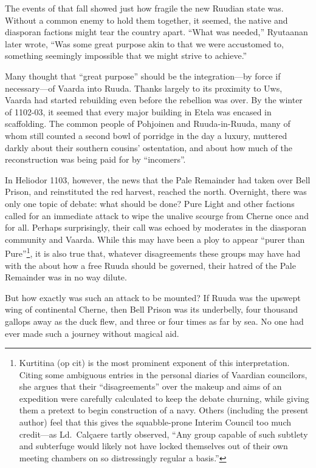 \documentclass[12pt]{report}
\begin{document}
The events of that fall showed just how fragile the new Ruudian state
was.  Without a common enemy to hold them together, it seemed, the
native and diasporan factions might tear the country apart.  ``What was
needed,'' Ryutaanan later wrote, ``Was some great purpose akin to that
we were accustomed to, something seemingly impossible that we might
strive to achieve.''

Many thought that ``great purpose'' should be the integration---by force
if necessary---of Vaarda into Ruuda.  Thanks largely to its proximity
to Uws, Vaarda had started rebuilding even before the rebellion was
over.  By the winter of 1102-03, it seemed that every major building
in Etela was encased in scaffolding.  The common people of Pohjoinen
and Ruuda-in-Ruuda, many of whom still counted a second bowl of
porridge in the day a luxury, muttered darkly about their southern
cousins' ostentation, and about how much of the reconstruction was
being paid for by ``incomers''.

In Heliodor 1103, however, the news that the Pale Remainder had taken
over Bell Prison, and reinstituted the red harvest, reached the north.
Overnight, there was only one topic of debate: what should be done?
Pure Light and other {\aemott} factions called for an immediate attack
to wipe the unalive scourge from Cherne once and for all.  Perhaps
surprisingly, their call was echoed by moderates in the diasporan
community and Vaarda.  While this may have been a ploy to appear
``purer than Pure''\footnote{Kurtitina (op cit) is the most prominent
exponent of this interpretation.  Citing some ambiguous entries in the
personal diaries of Vaardian councilors, she argues that their
``disagreements'' over the makeup and aims of an expedition were
carefully calculated to keep the debate churning, while giving them a
pretext to begin construction of a navy.  Others (including the
present author) feel that this gives the squabble-prone Interim
Council too much credit---as Ld.\ Cal\c{c}aere tartly observed, ``Any
group capable of such subtlety and subterfuge would likely not have
locked themselves out of their own meeting chambers on so
distressingly regular a basis.''}, it is also true that, whatever
disagreements these groups may have had with the {\aemott} about how a
free Ruuda should be governed, their hatred of the Pale Remainder was
in no way dilute.

But how exactly was such an attack to be mounted?  If Ruuda was the
upswept wing of continental Cherne, then Bell Prison was its
underbelly, four thousand gallops away as the duck flew, and three or
four times as far by sea.  No one had ever made such a journey without
magical aid.
\end{document}
